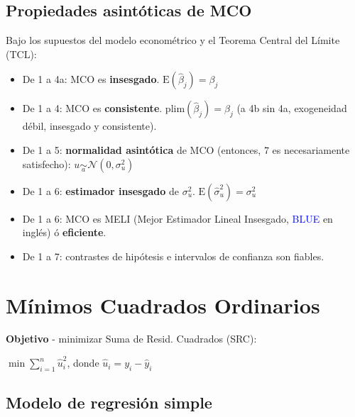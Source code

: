 \documentclass[10pt, a4paper, landscape]{extarticle}
\newcommand{\E}{\mathrm{E}}
\begin{document}
\begin{multicols}{3}
\subsection*{Propiedades asintóticas de MCO}

Bajo los supuestos del modelo econométrico y el Teorema Central del Límite (TCL):

\begin{itemize}[leftmargin=*]
	\item De 1 a 4a: MCO es \textbf{insesgado}. $\E(\hat{\beta}_j) = \beta_j$
	\item De 1 a 4: MCO es \textbf{consistente}. $\mathrm{plim}(\hat{\beta}_j) = \beta_j$ (a 4b sin 4a, exogeneidad débil, insesgado y consistente).
	\item De 1 a 5: \textbf{normalidad asintótica} de MCO (entonces, 7 es necesariamente satisfecho): $u \underset{a}{\sim} \mathcal{N} (0, \sigma^2_u)$
	\item De 1 a 6: \textbf{estimador insesgado} de $\sigma^2_u$. $\E(\hat{\sigma}^2_u) = \sigma^2_u$
	\item De 1 a 6: MCO es MELI (Mejor Estimador Lineal Insesgado, \textcolor{blue}{BLUE} en inglés) ó \textbf{eficiente}. 
	\item De 1 a 7: contrastes de hipótesis e intervalos de confianza son fiables.
\end{itemize}

\section*{Mínimos Cuadrados Ordinarios}

\textbf{Objetivo} - minimizar Suma de Resid. Cuadrados (SRC):

\begin{center}
	$\min \sum_{i=1}^n \hat{u}_i^2$, donde $\hat{u}_i = y_i - \hat{y}_i$
\end{center}

\subsection*{Modelo de regresión simple}

\setlength{\multicolsep}{2pt}
\setlength{\columnsep}{-40pt}
\begin{multicols}{2}



\end{multicols}
\end{multicols}
\end{document}
